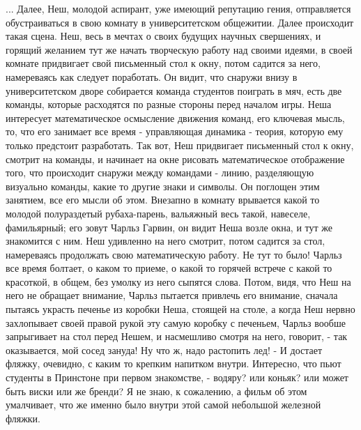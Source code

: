 ... Далее, Неш, молодой аспирант, уже имеющий репутацию гения, отправляется обустраиваться в свою
комнату в университетском общежитии. Далее происходит такая сцена. Неш, весь в мечтах о своих будущих
научных свершениях, и горящий желанием тут же начать творческую работу над своими идеями, в своей комнате
придвигает свой письменный стол к окну, потом садится за него, намереваясь как следует поработать.
Он видит, что снаружи внизу в университетском дворе собирается команда студентов поиграть в мяч, есть две команды, которые расходятся
по разные стороны перед началом игры. Неша интересует математическое осмысление движения команд, его ключевая мысль,
то, что его занимает все время - управляющая динамика - теория, которую ему только предстоит разработать.
Так вот, Неш придвигает письменный стол к окну, смотрит на команды, и начинает на окне рисовать математическое отображение
того, что происходит снаружи между командами - линию, разделяющую визуально команды, какие то другие знаки и символы.
Он поглощен этим занятием, все его мысли об этом. Внезапно в комнату врывается какой то молодой полураздетый рубаха-парень,
вальяжный весь такой, навеселе, фамильярный; его зовут Чарльз Гарвин, он видит Неша возле окна, и тут же знакомится с ним.
Неш удивленно на него смотрит, потом садится за стол, намереваясь продолжать свою математическую работу. Не тут то было!
Чарльз все время болтает, о каком то приеме, о какой то горячей встрече с какой то красоткой, в общем, без умолку из него сыпятся слова.
Потом, видя, что Неш на него не обращает внимание, Чарльз пытается привлечь его внимание, сначала 
пытаясь украсть печенье из коробки Неша, стоящей на столе, а когда Неш нервно захлопывает своей правой рукой 
эту самую коробку с печеньем, Чарльз вообше запрыгивает на стол перед Нешем, и насмешливо смотря на него, говорит, - 
так оказывается, мой сосед зануда! Ну что ж, надо растопить лед! - И достает фляжку, очевидно, с каким то крепким напитком внутри.
Интересно, что пьют студенты в Принстоне при первом знакомстве, - водяру? или коньяк? или может быть виски или же бренди?
Я не знаю, к сожалению, а фильм об этом умалчивает, что же именно было внутри этой самой небольшой железной фляжки. 

